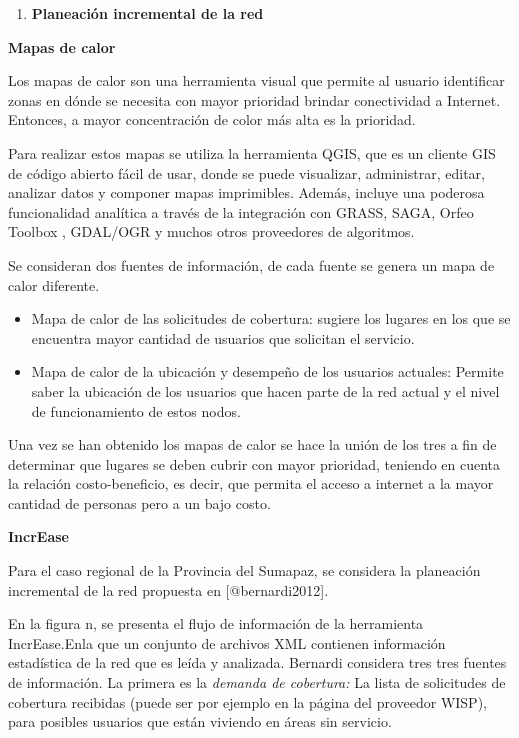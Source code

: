 \documentclass[]{article}
\providecommand{\tightlist}{%
  \setlength{\itemsep}{0pt}\setlength{\parskip}{0pt}}
\begin{document}
\begin{enumerate}
\def\labelenumi{\arabic{enumi}.}
\setcounter{enumi}{1}
\tightlist
\item
  \textbf{Planeación incremental de la red}
\end{enumerate}

\textbf{Mapas de calor}

Los mapas de calor son una herramienta visual que permite al usuario
identificar zonas en dónde se necesita con mayor prioridad brindar
conectividad a Internet. Entonces, a mayor concentración de color más
alta es la prioridad.

Para realizar estos mapas se utiliza la herramienta QGIS, que es un
cliente GIS de código abierto fácil de usar, donde se puede visualizar,
administrar, editar, analizar datos y componer mapas imprimibles.
Además, incluye una poderosa funcionalidad analítica a través de la
integración con GRASS, SAGA, Orfeo Toolbox , GDAL/OGR y muchos otros
proveedores de algoritmos.

Se consideran dos fuentes de información, de cada fuente se genera un
mapa de calor diferente.

\begin{itemize}
\item
  Mapa de calor de las solicitudes de cobertura: sugiere los lugares en
  los que se encuentra mayor cantidad de usuarios que solicitan el
  servicio.
\item
  Mapa de calor de la ubicación y desempeño de los usuarios actuales:
  Permite saber la ubicación de los usuarios que hacen parte de la red
  actual y el nivel de funcionamiento de estos nodos.
\end{itemize}

Una vez se han obtenido los mapas de calor se hace la unión de los tres
a fin de determinar que lugares se deben cubrir con mayor prioridad,
teniendo en cuenta la relación costo-beneficio, es decir, que permita el
acceso a internet a la mayor cantidad de personas pero a un bajo costo.

\textbf{IncrEase}

Para el caso regional de la Provincia del Sumapaz, se considera la
planeación incremental de la red propuesta en {[}@bernardi2012{]}.

En la figura n, se presenta el flujo de información de la herramienta
IncrEase.Enla que un conjunto de archivos XML contienen información
estadística de la red que es leída y analizada. Bernardi considera tres
tres fuentes de información. La primera es la \emph{demanda de
cobertura:} La lista de solicitudes de cobertura recibidas (puede ser
por ejemplo en la página del proveedor WISP), para posibles usuarios que
están viviendo en áreas sin servicio.
\end{document}
